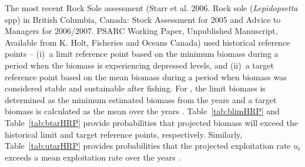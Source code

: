 The most recent Rock Sole assessment (Starr et al. 2006. Rock sole (\emph{Lepidopsetta} spp) in British Columbia, Canada: Stock Assessment for 2005 and Advice to Managers for 2006/2007. PSARC Working Paper, Unpublished Manuscript, Available from K. Holt, Fisheries and Oceans Canada) used historical reference points -- (i)~a limit reference point based on the minimum biomass during a period when the biomass is experiencing depressed levels, and (ii)~a target reference point based on the mean biomass during a period when biomass was considered stable and sustainable after fishing. For , the limit biomass is determined as the minimum estimated biomass from the years  and a target biomass is calculated as the mean over the years . Table~\ref{tab:blimHRP} and Table~\ref{tab:btarHRP} provide probabilities that projected biomass will exceed the historical limit and target reference points, respectively. Similarly, Table~\ref{tab:utarHRP} provides probabilities that the projected exploitation rate $u_t$ exceeds a mean exploitation rate over the years .



